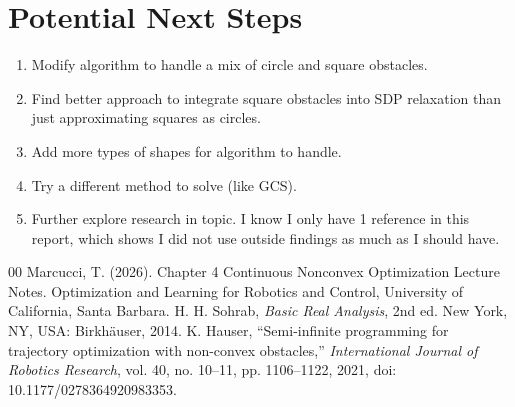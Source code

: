 \documentclass[conference]{IEEEtran}
\begin{document}
\section{Potential Next Steps}
\begin{enumerate}
    \item Modify algorithm to handle a mix of circle and square obstacles.
    \item Find better approach to integrate square obstacles into SDP relaxation than just approximating squares as circles.
    \item Add more types of shapes for algorithm to handle.
    \item Try a different method to solve (like GCS).
    \item Further explore research in topic. I know I only have 1 reference in this report, which shows I did not use outside findings as much as I should have.
\end{enumerate}

\begin{thebibliography}{00}
 Marcucci, T. (2026). Chapter 4 Continuous Nonconvex Optimization Lecture Notes. Optimization and Learning for Robotics and Control, University of California, Santa Barbara.
H. H. Sohrab,
\textit{Basic Real Analysis},
2nd ed.
New York, NY, USA: Birkhäuser, 2014.
K. Hauser,
``Semi-infinite programming for trajectory optimization with non-convex obstacles,''
\textit{International Journal of Robotics Research},
vol. 40, no. 10--11, pp. 1106--1122, 2021,
doi: 10.1177/0278364920983353.
\end{thebibliography}
\end{document}
